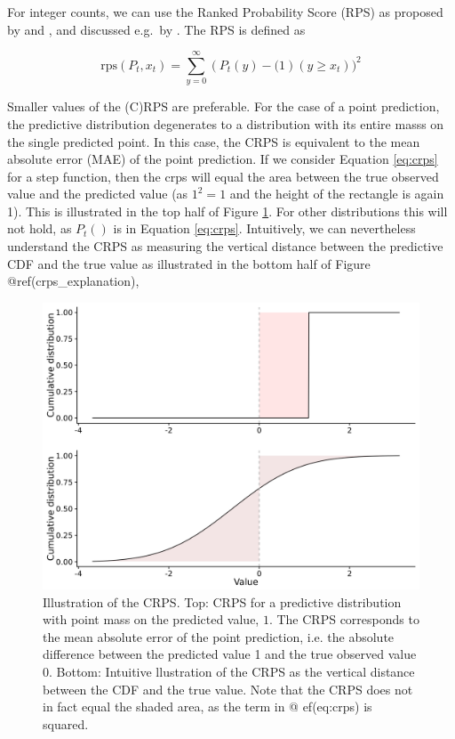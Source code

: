 \documentclass[
]{book}
\begin{document}
For integer counts, we can use the Ranked Probability Score (RPS) as proposed by \citet{epsteinScoringSystemProbability1969} and \citet{murphyRankedProbabilityScore1969}, and discussed e.g.~by \citet{czadoPredictiveModelAssessment2009}. The RPS is defined as

\[ \text{rps}(P_t, x_t) = \sum_{y = 0}^\infty (P_t(y) - \mathbb(1) (y \geq x_t))^2 \]

Smaller values of the (C)RPS are preferable. For the case of a point prediction, the predictive distribution degenerates to a distribution with its entire masss on the single predicted point. In this case, the CRPS is equivalent to the mean absolute error (MAE) of the point prediction. If we consider Equation \eqref{eq:crps} for a step function, then the crps will equal the area between the true observed value and the predicted value (as \(1^2 = 1\) and the height of the rectangle is again 1).
This is illustrated in the top half of Figure \ref{fig:crps-explanation}. For other distributions this will not hold, as \(P_t()\) is in Equation \eqref{eq:crps}. Intuitively, we can nevertheless understand the CRPS as measuring the vertical distance between the predictive CDF and the true value as illustrated in the bottom half of Figure @ref(crps\_explanation),

\begin{figure}
\includegraphics[width=1\linewidth]{../visualisation/chapter-3-evaluation/crps-explanation} \caption{Illustration of the CRPS. Top: CRPS for a predictive distribution with point mass on the predicted value, $1$. The CRPS corresponds to the mean absolute error of the point prediction, i.e. the absolute difference between the predicted value 1 and the true observed value 0. Bottom: Intuitive llustration of the CRPS as the vertical distance between the CDF and the true value. Note that the CRPS does not in fact equal the shaded area, as the term in @
ef(eq:crps) is squared.}\label{fig:crps-explanation}
\end{figure}
\end{document}
